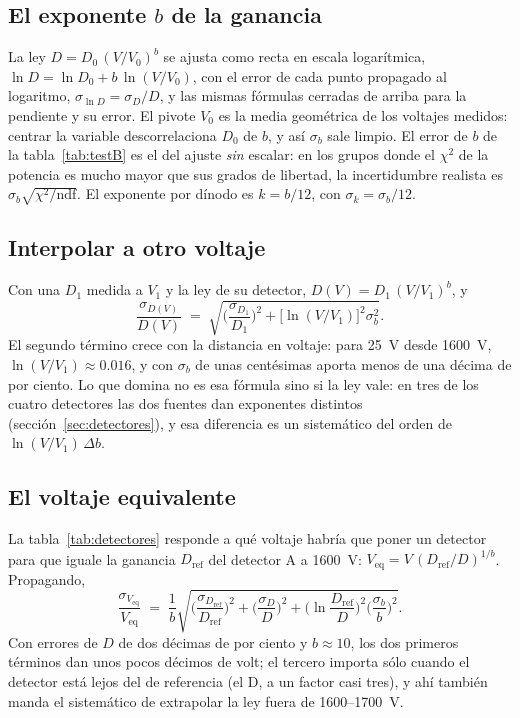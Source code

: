 \documentclass[11pt,a4paper]{article}
\begin{document}
\subsection{El exponente $b$ de la ganancia}

La ley $D = D_0\,(V/V_0)^b$ se ajusta como recta en escala logarítmica,
$\ln D = \ln D_0 + b\,\ln(V/V_0)$, con el error de cada punto propagado al
logaritmo, $\sigma_{\ln D} = \sigma_D/D$, y las mismas fórmulas cerradas de
arriba para la pendiente y su error. El pivote $V_0$ es la media geométrica de
los voltajes medidos: centrar la variable descorrelaciona $D_0$ de $b$, y así
$\sigma_b$ sale limpio. El error de $b$ de la tabla~\ref{tab:testB} es el del
ajuste \emph{sin} escalar: en los grupos donde el $\chi^2$ de la potencia es
mucho mayor que sus grados de libertad, la incertidumbre realista es
$\sigma_b\sqrt{\chi^2/\text{ndf}}$. El exponente por dínodo es $k = b/12$, con
$\sigma_k = \sigma_b/12$.

\subsection{Interpolar a otro voltaje}

Con una $D_1$ medida a $V_1$ y la ley de su detector,
$D(V) = D_1\,(V/V_1)^b$, y
\[
   \frac{\sigma_{D(V)}}{D(V)} \;=\;
   \sqrt{\Big(\frac{\sigma_{D_1}}{D_1}\Big)^2
   + \big[\ln(V/V_1)\big]^2\sigma_b^2 } .
\]
El segundo término crece con la distancia en voltaje: para 25~V desde 1600~V,
$\ln(V/V_1) \approx 0.016$, y con $\sigma_b$ de unas centésimas aporta menos
de una décima de por ciento. Lo que domina no es esa fórmula sino si la ley
vale: en tres de los cuatro detectores las dos fuentes dan exponentes
distintos (sección~\ref{sec:detectores}), y esa diferencia es un sistemático
del orden de $\ln(V/V_1)\,\Delta b$.

\subsection{El voltaje equivalente}

La tabla~\ref{tab:detectores} responde a qué voltaje habría que poner un
detector para que iguale la ganancia $D_{\text{ref}}$ del detector A a
1600~V: $V_{\text{eq}} = V\,(D_{\text{ref}}/D)^{1/b}$. Propagando,
\[
   \frac{\sigma_{V_{\text{eq}}}}{V_{\text{eq}}} \;=\; \frac{1}{b}
   \sqrt{\Big(\frac{\sigma_{D_{\text{ref}}}}{D_{\text{ref}}}\Big)^2
   + \Big(\frac{\sigma_D}{D}\Big)^2
   + \Big(\ln\frac{D_{\text{ref}}}{D}\Big)^2\Big(\frac{\sigma_b}{b}\Big)^2 } .
\]
Con errores de $D$ de dos décimas de por ciento y $b \approx 10$, los dos
primeros términos dan unos pocos décimos de volt; el tercero importa sólo
cuando el detector está lejos del de referencia (el D, a un factor casi tres),
y ahí también manda el sistemático de extrapolar la ley fuera de 1600--1700~V.
\end{document}
